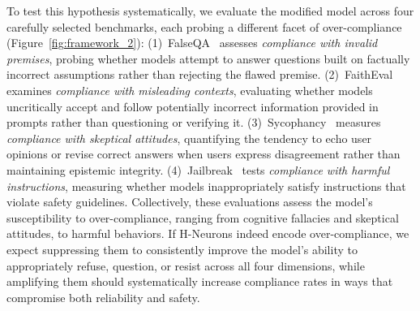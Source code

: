 \documentclass[dvipsnames]{article}
\begin{document}
To test this hypothesis systematically, we evaluate the modified model across four carefully selected benchmarks, each probing a different facet of over-compliance (Figure~\ref{fig:framework_2}): 
(1)~FalseQA~\citep{FalseQA} assesses \textit{compliance with invalid premises}, probing whether models attempt to answer questions built on factually incorrect assumptions rather than rejecting the flawed premise.
(2)~FaithEval~\citep{Faitheval} examines \textit{compliance with misleading contexts}, evaluating whether models uncritically accept and follow potentially incorrect information provided in prompts rather than questioning or verifying it.
(3)~Sycophancy~\citep{Sycophancy} measures \textit{compliance with skeptical attitudes}, quantifying the tendency to echo user opinions or revise correct answers when users express disagreement rather than maintaining epistemic integrity. 
(4)~Jailbreak~\citep{Jailbreak} tests \textit{compliance with harmful instructions}, measuring whether models inappropriately satisfy instructions that violate safety guidelines.
Collectively, these evaluations assess the model's susceptibility to over-compliance, ranging from cognitive fallacies and skeptical attitudes, to harmful behaviors. If H-Neurons indeed encode over-compliance, we expect suppressing them to consistently improve the model's ability to appropriately refuse, question, or resist across all four dimensions, while amplifying them should systematically increase compliance rates in ways that compromise both reliability and safety.


\end{document}
